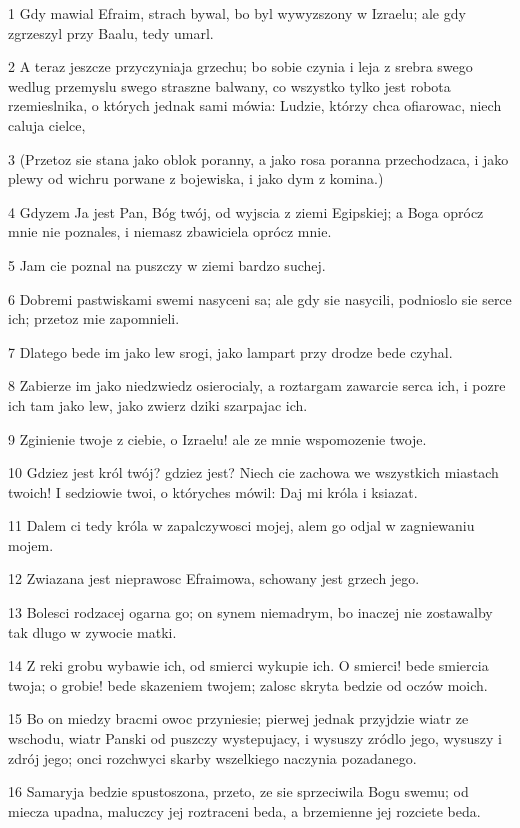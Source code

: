 \par 1 Gdy mawial Efraim, strach bywal, bo byl wywyzszony w Izraelu; ale gdy zgrzeszyl przy Baalu, tedy umarl.
\par 2 A teraz jeszcze przyczyniaja grzechu; bo sobie czynia i leja z srebra swego wedlug przemyslu swego straszne balwany, co wszystko tylko jest robota rzemieslnika, o których jednak sami mówia: Ludzie, którzy chca ofiarowac, niech caluja cielce,
\par 3 (Przetoz sie stana jako oblok poranny, a jako rosa poranna przechodzaca, i jako plewy od wichru porwane z bojewiska, i jako dym z komina.)
\par 4 Gdyzem Ja jest Pan, Bóg twój, od wyjscia z ziemi Egipskiej; a Boga oprócz mnie nie poznales, i niemasz zbawiciela oprócz mnie.
\par 5 Jam cie poznal na puszczy w ziemi bardzo suchej.
\par 6 Dobremi pastwiskami swemi nasyceni sa; ale gdy sie nasycili, podnioslo sie serce ich; przetoz mie zapomnieli.
\par 7 Dlatego bede im jako lew srogi, jako lampart przy drodze bede czyhal.
\par 8 Zabierze im jako niedzwiedz osierocialy, a roztargam zawarcie serca ich, i pozre ich tam jako lew, jako zwierz dziki szarpajac ich.
\par 9 Zginienie twoje z ciebie, o Izraelu! ale ze mnie wspomozenie twoje.
\par 10 Gdziez jest król twój? gdziez jest? Niech cie zachowa we wszystkich miastach twoich! I sedziowie twoi, o któryches mówil: Daj mi króla i ksiazat.
\par 11 Dalem ci tedy króla w zapalczywosci mojej, alem go odjal w zagniewaniu mojem.
\par 12 Zwiazana jest nieprawosc Efraimowa, schowany jest grzech jego.
\par 13 Bolesci rodzacej ogarna go; on synem niemadrym, bo inaczej nie zostawalby tak dlugo w zywocie matki.
\par 14 Z reki grobu wybawie ich, od smierci wykupie ich. O smierci! bede smiercia twoja; o grobie! bede skazeniem twojem; zalosc skryta bedzie od oczów moich.
\par 15 Bo on miedzy bracmi owoc przyniesie; pierwej jednak przyjdzie wiatr ze wschodu, wiatr Panski od puszczy wystepujacy, i wysuszy zródlo jego, wysuszy i zdrój jego; onci rozchwyci skarby wszelkiego naczynia pozadanego.
\par 16 Samaryja bedzie spustoszona, przeto, ze sie sprzeciwila Bogu swemu; od miecza upadna, maluczcy jej roztraceni beda, a brzemienne jej rozciete beda.

